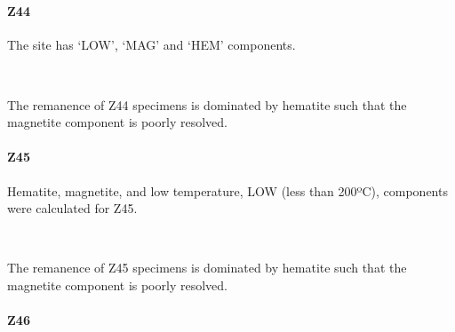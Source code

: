 \documentclass[11pt]{article}
\begin{document}
    \begin{center}
    \end{center}
    { \hspace*{\fill} \\}
    
    \newpage
    
    \paragraph{Z44}\label{z44}

    The site has `LOW', `MAG' and `HEM' components.



    \begin{center}
    \end{center}
    { \hspace*{\fill} \\}
    
    The remanence of Z44 specimens is dominated by hematite such that the
magnetite component is poorly resolved.

\newpage

    \paragraph{Z45}\label{z45}

    Hematite, magnetite, and low temperature, LOW (less than 200ºC),
components were calculated for Z45.



    \begin{center}
    \end{center}
    { \hspace*{\fill} \\}
    
    The remanence of Z45 specimens is dominated by hematite such that the
magnetite component is poorly resolved.

\newpage

    \paragraph{Z46}\label{z46}
\end{document}
